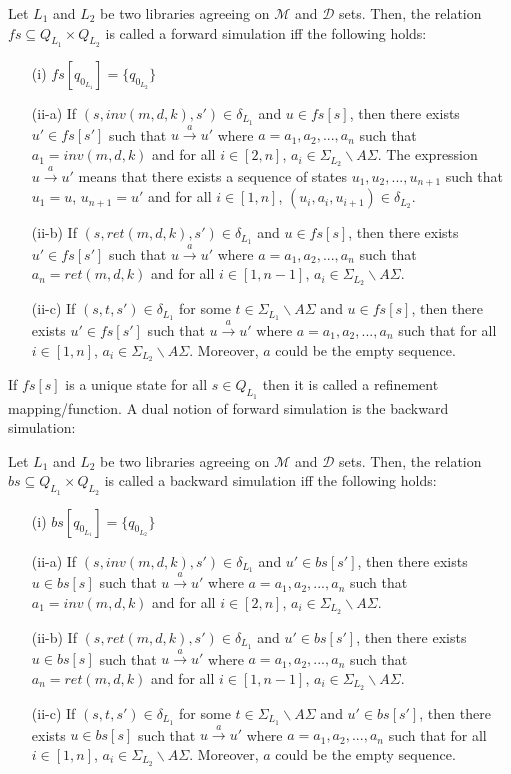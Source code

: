 \begin{dfn}
Let $L_1$ and $L_2$ be two libraries agreeing on $\mathcal{M}$ and $\mathcal{D}$ sets. Then, the relation $fs \subseteq Q_{L_1} \times Q_{L_2}$ is called a forward simulation iff the following holds:
\begin{itemize}
\item[(i)] $fs[q_{0_{L_1}}] = \{q_{0_{L_2}} \}$
\item[(ii-a)] If $(s,inv(m,d,k),s') \in \delta_{L_1}$ and $u \in fs[s]$, then there exists $u' \in fs[s']$ such that $u \xrightarrow{a} u'$ where $a = a_1, a_2, ..., a_n$ such that $a_1 = inv(m,d,k)$ and for all $i \in [2,n]$, $a_i \in \Sigma_{L_2} \backslash A\Sigma $. The expression $u \xrightarrow{a} u'$ means that there exists a sequence of states $u_1, u_2,...,u_{n+1}$ such that $u_1 = u$, $u_{n+1} = u'$ and for all $i \in [1,n]$, $(u_i, a_i, u_{i+1}) \in \delta_{L_2}$.
\item[(ii-b)] If $(s,ret(m,d,k),s') \in \delta_{L_1}$ and $u \in fs[s]$, then there exists $u' \in fs[s']$ such that $u \xrightarrow{a} u'$ where $a = a_1, a_2, ..., a_n$ such that $a_n = ret(m,d,k)$ and for all $i \in [1,n-1]$, $a_i \in \Sigma_{L_2} \backslash A\Sigma $. 
\item[(ii-c)] If $(s,t,s') \in \delta_{L_1}$ for some $t \in \Sigma_{L_1}\backslash A\Sigma$ and $u \in fs[s]$, then there exists $u' \in fs[s']$ such that $u \xrightarrow{a} u'$ where $a = a_1, a_2, ..., a_n$ such that for all $i \in [1,n]$, $a_i \in \Sigma_{L_2} \backslash A\Sigma $. Moreover, $a$ could be the empty sequence.
\end{itemize}
\end{dfn}
If $fs[s]$ is a unique state for all $s \in Q_{L_1}$ then it is called a refinement mapping/function. A dual notion of forward simulation is the backward simulation:
\begin{dfn}
Let $L_1$ and $L_2$ be two libraries agreeing on $\mathcal{M}$ and $\mathcal{D}$ sets. Then, the relation $bs \subseteq Q_{L_1} \times Q_{L_2}$ is called a backward simulation iff the following holds:
\begin{itemize}
\item[(i)] $bs[q_{0_{L_1}}] = \{q_{0_{L_2}} \}$
\item[(ii-a)] If $(s,inv(m,d,k),s') \in \delta_{L_1}$ and $u' \in bs[s']$, then there exists $u \in bs[s]$ such that $u \xrightarrow{a} u'$ where $a = a_1, a_2, ..., a_n$ such that $a_1 = inv(m,d,k)$ and for all $i \in [2,n]$, $a_i \in \Sigma_{L_2} \backslash A\Sigma $. 
\item[(ii-b)] If $(s,ret(m,d,k),s') \in \delta_{L_1}$ and $u' \in bs[s']$, then there exists $u \in bs[s]$ such that $u \xrightarrow{a} u'$ where $a = a_1, a_2, ..., a_n$ such that $a_n = ret(m,d,k)$ and for all $i \in [1,n-1]$, $a_i \in \Sigma_{L_2} \backslash A\Sigma $. 
\item[(ii-c)] If $(s,t,s') \in \delta_{L_1}$ for some $t \in \Sigma_{L_1}\backslash A\Sigma$ and $u' \in bs[s']$, then there exists $u \in bs[s]$ such that $u \xrightarrow{a} u'$ where $a = a_1, a_2, ..., a_n$ such that for all $i \in [1,n]$, $a_i \in \Sigma_{L_2} \backslash A\Sigma $. Moreover, $a$ could be the empty sequence.
\end{itemize}
\end{dfn}
